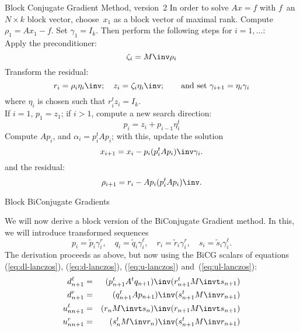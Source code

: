 \documentclass[11pt]{artikel3}
\begin{document}
\begin{Outline}
\begin{algorithm}{Block Conjugate Gradient Method, version~2}
In order to solve $Ax=f$ with $f$~an $N\times k$ block vector,
choose~$x_1$ as a block vector of maximal rank. Compute $\rho_1=Ax_1-f$.
Set $\gamma_1=I_k$.
Then perform the following steps for $i=1,\ldots$:\\
Apply the preconditioner:
\begin{equation} \zeta_i=M\inv \rho_i \end{equation}
Transform the residual:
\begin{equation} r_i=\rho_i\eta_i\inv;\quad z_i=\zeta_i\eta_i\inv;
    \qquad \hbox{and set $\gamma_{i+1}=\eta_i\gamma_i$}
    \end{equation}
where $\eta_i$ is chosen such that $r_i^tz_i=I_k$.\\
If $i=1$, $p_1=z_1$; if $i>1$, compute a new search direction:
\begin{equation} p_i=z_i+p_{i-1}\eta_i^t\end{equation}
Compute $Ap_i$, and $\alpha_i=p_i^tAp_i$; with this, update the solution
\begin{equation} x_{i+1}=x_i - p_i( p_i^tA p_i)\inv\gamma_i.
    \end{equation}
and the residual:
\begin{equation} \rho_{i+1}= r_i -A p_i( p_i^tA p_i)\inv.
    \end{equation}
\end{algorithm}

 {Block BiConjugate Gradients}

\def\gl{\gamma^\ell}\def\gr{\gamma^r}
\def\glt{\gamma^{\ell^t}}\def\grt{\gamma^{r^t}}
\def\glinv{\gamma^{\ell\inv}}\def\grinv{\gamma^{r\inv}}
\def\glinvt{\gamma^{\ell\invt}}\def\grinvt{\gamma^{r\invt}}

We will now derive a block version of the BiConjugate Gradient method.
In this, we will introduce transformed sequences 
\[ p_i=\tilde p_i\gr_i,\quad q_i=\tilde q_i\gl_i,\quad
   r_i=\tilde r_i\gr_i,\quad s_i=\tilde s_i\gl_i. \]
The derivation proceeds as above,
but now using the BiCG scalars of equations
(\ref{eq:dl-lanczos}), (\ref{eq:d-lanczos}), (\ref{eq:u-lanczos})
and~(\ref{eq:ul-lanczos}):
\begin{eqnarray*}
    d^\ell_{n+1}&=&(p_{n+1}^tA^tq_{n+1})\inv (r_{n+1}^tM\invt s_{n+1})\\
    d^r_{n+1}&=&(q_{n+1}^tAp_{n+1})\inv (s_{n+1}^tM\inv r_{n+1})\\
    u^\ell_{nn+1}&=&(r_nM\invt s_n)\inv(r_{n+1}M\invt s_{n+1})\\
    u^r_{nn+1}&=&(s_n^tM\inv r_n)\inv (s_{n+1}^tM\inv r_{n+1})
\end{eqnarray*}


\end{Outline}
\end{document}

